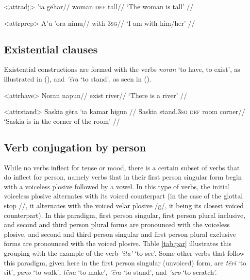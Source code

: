 \documentclass[12pt]{article}
\begin{document}
\ex<attradj>
\begingl %
 'ia gëhar//
\glb woman \textsc{def} tall//
\glft `The woman is tall' // 
\endgl
\xe 

\ex<attrprep>
\begingl %
\gla A'u 'ora nimu//
\glb {\First{}\Sg{}} with \textsc{3sg}//
\glft `I am with him/her' // 
\endgl
\xe 

\subsection{Existential clauses}
Existential constructions are formed with the verbs \textit{noran} `to have, to exist', as illustrated in (), and \textit{'ëra} `to stand', as seen in ().

\ex<attrhave>
\begingl %
\gla Noran napun//
\glb exist river//
\glft `There is a river' // 
\endgl
\xe 

\ex<attrstand>
\begingl %
\gla Saskia gëra ‘ia kamar higun //
\glb Saskia stand.\textsc{3sg} \textsc{def} room corner//
\glft `Saskia is in the corner of the room' // 
\endgl
\xe 

\subsection{Verb conjugation by person}\label{sec:conj}

While no verbs inflect for tense or mood, there is a certain subset of verbs that do inflect for person, namely verbs that in their first person singular form begin with a voiceless plosive followed by a vowel. In this type of verbs, the initial voiceless plosive alternates with its voiced counterpart (in the case of the glottal stop /\textglotstop/, it alternates with the voiced velar plosive /g/, it being its closest voiced counterpart). In this paradigm, first person singular, first person plural inclusive, and second and third person plural forms are pronounced with the voiceless plosive, and second and third person singular and first person plural exclusive forms are pronounced with the voiced plosive. Table \ref{tab:par} illustrates this grouping with the example of the verb \textit{'ita'} `to see'. Some other verbs that follow this paradigm, given here in the first person singular (unvoiced) form, are \textit{tëri} `to sit', \textit{pano} `to walk', \textit{tëna} `to make', \textit{'ëra} `to stand', and \textit{'aro} `to scratch'.
\end{document}
